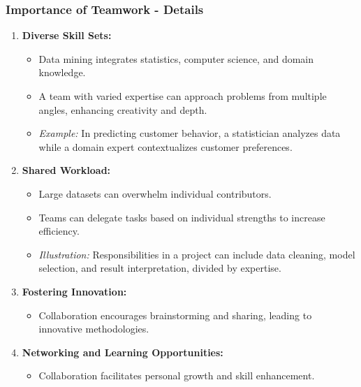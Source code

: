 \documentclass[aspectratio=169]{beamer}
\begin{document}
\begin{frame}[fragile]
    \frametitle{Importance of Teamwork - Details}
    \begin{enumerate}
        \item \textbf{Diverse Skill Sets:}
        \begin{itemize}
            \item Data mining integrates statistics, computer science, and domain knowledge.
            \item A team with varied expertise can approach problems from multiple angles, enhancing creativity and depth.
            \item \textit{Example:} In predicting customer behavior, a statistician analyzes data while a domain expert contextualizes customer preferences.
        \end{itemize}
        
        \item \textbf{Shared Workload:}
        \begin{itemize}
            \item Large datasets can overwhelm individual contributors.
            \item Teams can delegate tasks based on individual strengths to increase efficiency.
            \item \textit{Illustration:} Responsibilities in a project can include data cleaning, model selection, and result interpretation, divided by expertise.
        \end{itemize}

        \item \textbf{Fostering Innovation:}
        \begin{itemize}
            \item Collaboration encourages brainstorming and sharing, leading to innovative methodologies.
        \end{itemize}

        \item \textbf{Networking and Learning Opportunities:}
        \begin{itemize}
            \item Collaboration facilitates personal growth and skill enhancement.
        \end{itemize}
    \end{enumerate}
\end{frame}
\end{document}

